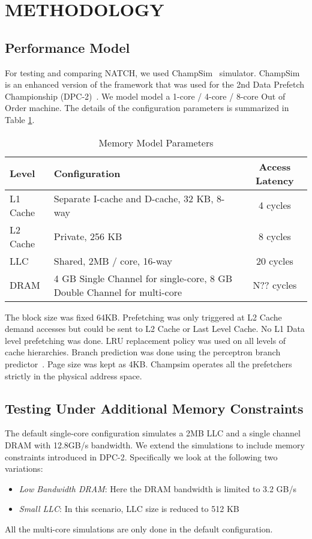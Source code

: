 \section{METHODOLOGY}
\label{Method}

\subsection{Performance Model}
\label{Method-Model}
For testing and comparing NATCH, we used ChampSim~\cite{Champsim}
simulator.  ChampSim is an enhanced version of the framework that was
used for the 2nd Data Prefetch Championship (DPC-2)~\cite{DPC_2}. We
model model a 1-core / 4-core / 8-core Out of Order machine. The
details of the configuration parameters is summarized in Table
\ref{tab:Sim_params}.

\begin{table}[]
    \centering
    \begin{tabular}{|l|p{3.6cm}|c|}
    \hline
    Level & Configuration & Access Latency \\
    \hline
         L1 Cache & Separate I-cache and D-cache, 32 KB, 8-way & 4 cycles\\
         L2 Cache & Private, 256 KB & 8 cycles\\
         LLC & Shared, 2MB / core, 16-way & 20 cycles\\
         DRAM & 4 GB Single Channel for single-core, 8 GB Double Channel for multi-core & N?? cycles\\
    \hline
    \end{tabular}
    \caption{Memory Model Parameters}
    \label{tab:Sim_params}
\end{table}

The block size was fixed 64KB. Prefetching was only triggered at L2
Cache demand accesses but could be sent to L2 Cache or Last Level
Cache.  No L1 Data level prefetching was done.  LRU replacement policy
was used on all levels of cache hierarchies.  Branch prediction was
done using the perceptron branch predictor~\cite{Perc_Branch}.  Page
size was kept as 4KB.  Champsim operates all the prefetchers strictly
in the physical address space.

\subsection{Testing Under Additional Memory Constraints}
\label{Method-AdditionalMem}
The default single-core configuration simulates a 2MB LLC and a single
channel DRAM with 12.8GB/s bandwidth.  We extend the simulations to
include memory constraints introduced in DPC-2.  Specifically we look
at the following two variations:
\begin{itemize}
\item \textit{Low Bandwidth DRAM}: Here the DRAM bandwidth is limited
  to 3.2 GB/s
\item \textit{Small LLC}: In this scenario, LLC size is reduced to 512
  KB
\end{itemize}
All the multi-core simulations are only done in the default
configuration.

